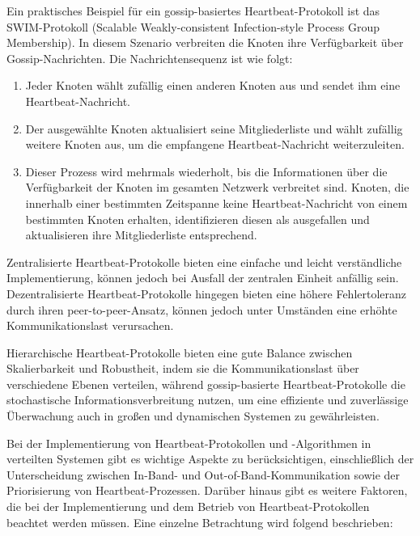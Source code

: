 Ein praktisches Beispiel für ein gossip-basiertes Heartbeat-Protokoll ist das SWIM-Protokoll (Scalable Weakly-consistent Infection-style Process Group Membership). In diesem Szenario verbreiten die Knoten ihre Verfügbarkeit über Gossip-Nachrichten. Die Nachrichtensequenz ist wie folgt:
\begin{enumerate}[label=(\alph*)]
\item Jeder Knoten wählt zufällig einen anderen Knoten aus und sendet ihm eine Heartbeat-Nachricht.
\item Der ausgewählte Knoten aktualisiert seine Mitgliederliste und wählt zufällig weitere Knoten aus, um die empfangene Heartbeat-Nachricht weiterzuleiten.
\item Dieser Prozess wird mehrmals wiederholt, bis die Informationen über die Verfügbarkeit der Knoten im gesamten Netzwerk verbreitet sind.
Knoten, die innerhalb einer bestimmten Zeitspanne keine Heartbeat-Nachricht von einem bestimmten Knoten erhalten, identifizieren diesen als ausgefallen und aktualisieren ihre Mitgliederliste entsprechend.
\end{enumerate}

Zentralisierte Heartbeat-Protokolle bieten eine einfache und leicht verständliche Implementierung, können jedoch bei Ausfall der zentralen Einheit anfällig sein. Dezentralisierte Heartbeat-Protokolle hingegen bieten eine höhere Fehlertoleranz durch ihren peer-to-peer-Ansatz, können jedoch unter Umständen eine erhöhte Kommunikationslast verursachen.

Hierarchische Heartbeat-Protokolle bieten eine gute Balance zwischen Skalierbarkeit und Robustheit, indem sie die Kommunikationslast über verschiedene Ebenen verteilen, während gossip-basierte Heartbeat-Protokolle die stochastische Informationsverbreitung nutzen, um eine effiziente und zuverlässige Überwachung auch in großen und dynamischen Systemen zu gewährleisten.


Bei der Implementierung von Heartbeat-Protokollen und -Algorithmen in verteilten Systemen gibt es wichtige Aspekte zu berücksichtigen, einschließlich der Unterscheidung zwischen In-Band- und Out-of-Band-Kommunikation sowie der Priorisierung von Heartbeat-Prozessen. Darüber hinaus gibt es weitere Faktoren, die bei der Implementierung und dem Betrieb von Heartbeat-Protokollen beachtet werden müssen. Eine einzelne Betrachtung wird folgend beschrieben:

